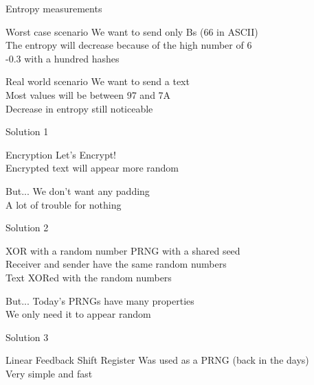 \documentclass[11pt, compress]{beamer}
\begin{document}
\begin{frame}{Entropy measurements}
    \vfill
    \begin{block}{Worst case scenario}
        We want to send only Bs (66 in ASCII)\\
        The entropy will decrease because of the high number of 6\\
        -0.3 with a hundred hashes
    \end{block}
    \vfill
    \begin{block}{Real world scenario}
        We want to send a text\\
        Most values will be between 97 and 7A\\
        Decrease in entropy still noticeable
    \end{block}
    \vfill
\end{frame}


\begin{frame}{Solution 1}
    \vfill
    \begin{block}{Encryption}
        Let's Encrypt!\\
        Encrypted text will appear more random
    \end{block}
    \vfill
    \begin{block}{But...}
        We don't want any padding\\
        A lot of trouble for nothing
    \end{block}
    \vfill
\end{frame}


\begin{frame}{Solution 2}
    \vfill
    \begin{block}{XOR with a random number}
        PRNG with a shared seed\\
        Receiver and sender have the same random numbers\\
        Text XORed with the random numbers
    \end{block}
    \vfill
    \begin{block}{But...}
        Today's PRNGs have many properties\\
        We only need it to appear random
    \end{block}
    \vfill
\end{frame}


\begin{frame}{Solution 3}
    \vfill
    \begin{block}{Linear Feedback Shift Register}
        Was used as a PRNG (back in the days)\\
        Very simple and fast
    \end{block}
    \vfill
\end{frame}
\end{document}
